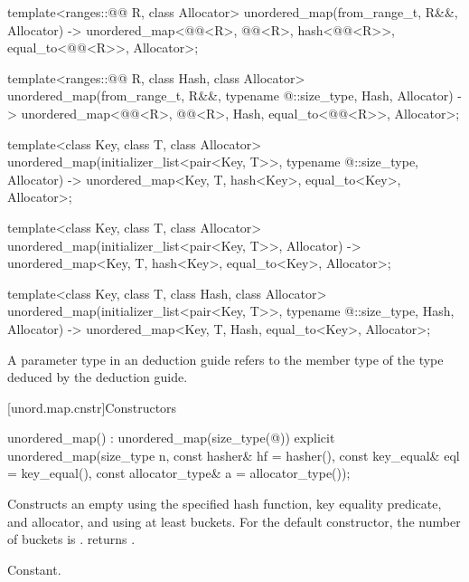 \begin{codeblock}
{  template<ranges::@@ R, class Allocator>
    unordered_map(from_range_t, R&&, Allocator)
      -> unordered_map<@@<R>, @@<R>, hash<@@<R>>,
                       equal_to<@@<R>>, Allocator>;

  template<ranges::@@ R, class Hash, class Allocator>
    unordered_map(from_range_t, R&&, typename @\seebelow@::size_type, Hash, Allocator)
      -> unordered_map<@@<R>, @@<R>, Hash,
                       equal_to<@@<R>>, Allocator>;

  template<class Key, class T, class Allocator>
    unordered_map(initializer_list<pair<Key, T>>, typename @\seebelow@::size_type,
                  Allocator)
      -> unordered_map<Key, T, hash<Key>, equal_to<Key>, Allocator>;

  template<class Key, class T, class Allocator>
    unordered_map(initializer_list<pair<Key, T>>, Allocator)
      -> unordered_map<Key, T, hash<Key>, equal_to<Key>, Allocator>;

  template<class Key, class T, class Hash, class Allocator>
    unordered_map(initializer_list<pair<Key, T>>, typename @\seebelow@::size_type, Hash,
                  Allocator)
      -> unordered_map<Key, T, Hash, equal_to<Key>, Allocator>;
}
\end{codeblock}

\pnum
A  parameter type in an  deduction guide
refers to the  member type of the type deduced by the deduction guide.

[unord.map.cnstr]{Constructors}

%
\begin{itemdecl}
unordered_map() : unordered_map(size_type(@\seebelow@)) { }
explicit unordered_map(size_type n,
                       const hasher& hf = hasher(),
                       const key_equal& eql = key_equal(),
                       const allocator_type& a = allocator_type());
\end{itemdecl}

\begin{itemdescr}
\pnum
\effects
Constructs an empty  using the
specified hash function, key equality predicate, and allocator, and
using at least  buckets.  For the default constructor,
the number of buckets is .
 returns .

\pnum
\complexity
Constant.
\end{itemdescr}

